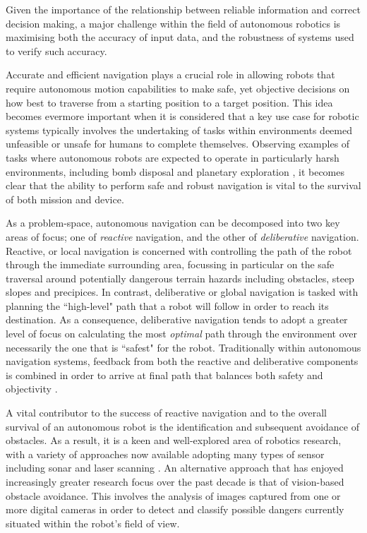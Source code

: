 Given the importance of the relationship between reliable information and correct decision making, a major challenge within the field of autonomous robotics is maximising both the accuracy of input data, and the robustness of systems used to verify such accuracy.

  Accurate and efficient navigation plays a crucial role in allowing robots that require autonomous motion capabilities to make safe, yet objective decisions on how best to traverse from a starting position to a target position. This idea becomes evermore important when it is considered that a key use case for robotic systems typically involves the undertaking of tasks within environments deemed unfeasible or unsafe for humans to complete themselves. Observing examples of tasks where autonomous robots are expected to operate in particularly harsh environments, including bomb disposal \cite{bomb-disposal} and planetary exploration \cite{planet-explore}, it becomes clear that the ability to perform safe and robust navigation is vital to the survival of both mission and device.

As a problem-space, autonomous navigation can be decomposed into two key areas of focus; one of \textit{reactive} navigation, and the other of \textit{deliberative} navigation. Reactive, or local navigation is concerned with controlling the path of the robot through the immediate surrounding area, focussing in particular on the safe traversal around potentially dangerous terrain hazards including obstacles, steep slopes and precipices. In contrast, deliberative or global navigation is tasked with planning the ``high-level" path that a robot will follow in order to reach its destination. As a consequence, deliberative navigation tends to adopt a greater level of focus on calculating the most \textit{optimal} path through the environment over necessarily the one that is ``safest" for the robot. Traditionally within autonomous navigation systems, feedback from both the reactive and deliberative components is combined in order to arrive at final path that balances both safety and objectivity \cite{mer-rover}. 

A vital contributor to the success of reactive navigation and to the overall survival of an autonomous robot is the identification and subsequent avoidance of obstacles. As a result, it is a keen and well-explored area of robotics research, with a variety of approaches now available adopting many types of sensor including sonar \cite{sonar-sensor} and laser scanning \cite{laser-sensor}. An alternative approach that has enjoyed increasingly greater research focus over the past decade is that of vision-based obstacle avoidance. This involves the analysis of images captured from one or more digital cameras in order to detect and classify possible dangers currently situated within the robot's field of view. 

